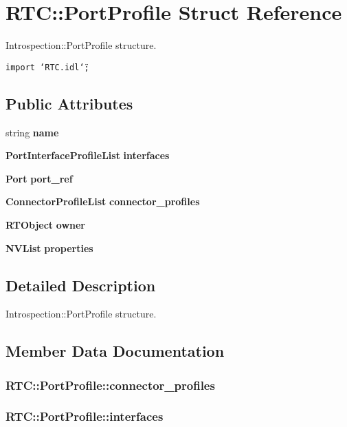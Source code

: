 \section{RTC::Port\-Profile Struct Reference}
\label{structRTC_1_1PortProfile}
Introspection::Port\-Profile structure.  


{\tt import \char`\"{}RTC.idl\char`\"{};}

\subsection*{Public Attributes}
\begin{CompactItemize}
\item 
string {\bf name}
\item 
{\bf Port\-Interface\-Profile\-List} {\bf interfaces}
\item 
{\bf Port} {\bf port\_\-ref}
\item 
{\bf Connector\-Profile\-List} {\bf connector\_\-profiles}
\item 
{\bf RTObject} {\bf owner}
\item 
{\bf NVList} {\bf properties}
\end{CompactItemize}


\subsection{Detailed Description}
Introspection::Port\-Profile structure. 



\subsection{Member Data Documentation}
\subsubsection{ {\bf RTC::Port\-Profile::connector\_\-profiles}}\label{structRTC_1_1PortProfile_RTC_1_1PortProfileo3}


\subsubsection{ {\bf RTC::Port\-Profile::interfaces}}\label{structRTC_1_1PortProfile_RTC_1_1PortProfileo1}


